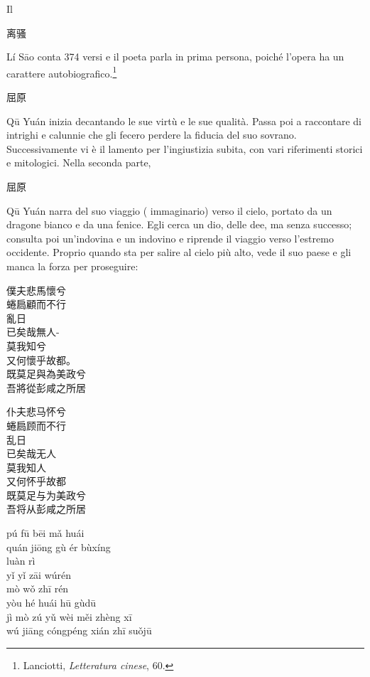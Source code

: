\documentclass[12pt,titlepage]{article}
\begin{document}
Il 
\begin{CJK*}{UTF8}{gbsn}离骚\end{CJK*}
 Lí Sāo conta 374 versi e il poeta parla in prima persona, poiché l'opera ha un carattere autobiografico.\footnote{Lanciotti, \emph{Letteratura cinese}, 60.}
\begin{CJK*}{UTF8}{gbsn}屈原 \end{CJK*}
Qū Yuán inizia decantando le sue virtù e le sue qualità. Passa poi a raccontare di intrighi e calunnie che gli fecero perdere la fiducia del suo sovrano. Successivamente vi è il lamento per l'ingiustizia subita, con vari riferimenti storici e mitologici. Nella seconda parte,
 \begin{CJK*}{UTF8}{gbsn}屈原\end{CJK*}
  Qū Yuán narra del suo viaggio ( immaginario) verso il cielo, portato da un dragone bianco e da una fenice. Egli cerca un dio, delle dee, ma senza successo; consulta poi un'indovina e un indovino e riprende il viaggio verso l'estremo occidente. Proprio quando sta per salire al cielo più alto, vede il suo paese e gli manca la forza per proseguire:
  \newpage
\begin{multicols}{3}
 \begin{CJK*}{UTF8}{gbsn}
 \hspace{-1.5em}僕夫悲馬懷兮\\
 蜷扃顧而不行\\
 亂日\\
 已矣哉無人-\\
 莫我知兮\\
 又何懷乎故都。\\
 既莫足與為美政兮 \\
吾將從彭咸之所居\footnotemark

\end{CJK*}
\columnbreak

 \begin{CJK*}{UTF8}{gbsn}
\hspace{-1.5em}仆夫悲马怀兮\\
 蜷扃顾而不行\\
 乱日\\
已矣哉无人\\
莫我知人\\
 又何怀乎故都\\
既莫足与为美政兮 \\
吾将从彭咸之所居\\
\end{CJK*}
\columnbreak

\hspace{-1.5em}pú fū bēi mǎ huái \\
quán jiōng gù ér bùxíng\\
luàn rì	\\
yǐ yǐ zāi wúrén	\\
mò wǒ zhī rén	\\
yòu hé huái hū gùdū\\
jì mò zú yǔ wèi měi zhèng xī\\
wú jiāng cóngpéng xián zhī suǒjū\\
\columnbreak
\end{multicols}
\end{document}
